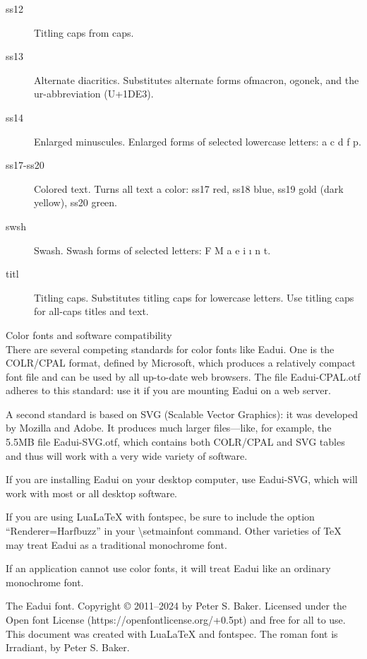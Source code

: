 \documentclass[11pt,letterpaper,twoside,openany]{book}
\begin{document}
{\begin{description}
  \item[\irsc ss12] Titling caps from caps.

  \item[\irsc ss13] Alternate diacritics. Substitutes alternate forms of\linebreak macron,
  ogonek, and the ur-abbreviation (U+1DE3).

  \item[\irsc ss14] Enlarged minuscules. Enlarged forms of selected lowercase letters:
  {\irit a c d f p}.

  \item[\irsc ss17-ss20] Colored text. Turns all text a color: ss17 red, ss18 blue,
  ss19 gold (dark yellow), ss20 green.

  \item[\irsc swsh] Swash. Swash forms of selected letters: {\irit F M a e i ı n t}.

  \item[\irsc titl] Titling caps. Substitutes titling caps for lowercase letters.
  Use titling caps for all-caps titles and text.

\end{description}
}

\newpage

\noindent Color fonts and software compatibility\\[1ex]

\noindent\normalsize\irrm There are several competing standards for color fonts like Eadui. One is
the COLR/CPAL format, defined by Microsoft, which produces a relatively compact font file
and can be used by all up-to-date web browsers. The file Eadui-CPAL.otf adheres to this
standard: use it if you are mounting Eadui on a web server.

A second standard is based on SVG (Scalable Vector Graphics): it was developed by
Mozilla and Adobe. It produces much larger files---like, for example, the 5.5MB file
Eadui-SVG.otf, which contains both COLR/CPAL and SVG tables and thus will work with
a very wide variety of software.

If you are installing Eadui on your desktop computer, use Eadui-SVG, which will work with
most or all desktop software.

If you are using {Lua\LaTeX} with fontspec, be sure to include the option “Renderer=Harfbuzz” in your
\textbackslash setmainfont command. Other varieties of {\TeX} may treat Eadui as a traditional
monochrome font.

If an application cannot use color fonts, it will treat Eadui like an ordinary monochrome font.
\vfill

\noindent\irit The Eadui font. Copyright © 2011--2024 by Peter S. Baker. Licensed under the Open font
License (https://openfontlicense.org/\kern+0.5pt) and free for all to use. This document was
created with {Lua\LaTeX} and fontspec. The roman font is Irradiant, by Peter S. Baker.
\end{document}
